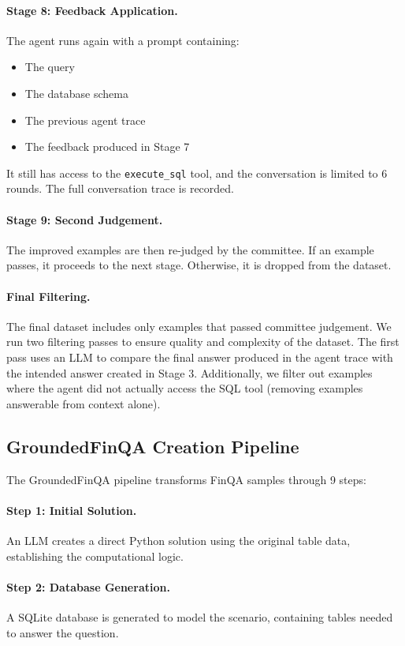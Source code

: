 \documentclass[11pt]{article}
\newcommand{\groundedfinqa}{GroundedFinQA\xspace}
\begin{document}
\paragraph{Stage 8: Feedback Application.}
The agent runs again with a prompt containing:
\begin{itemize}
    \item The query
    \item The database schema
    \item The previous agent trace
    \item The feedback produced in Stage 7
\end{itemize}
It still has access to the \texttt{execute\_sql} tool, and the conversation is limited to 6 rounds. The full conversation trace is recorded.

\paragraph{Stage 9: Second Judgement.}
The improved examples are then re-judged by the committee. If an example passes, it proceeds to the next stage. Otherwise, it is dropped from the dataset.

\paragraph{Final Filtering.}
The final dataset includes only examples that passed committee judgement. We run two filtering passes to ensure quality and complexity of the dataset. The first pass uses an LLM to compare the final answer produced in the agent trace with the intended answer created in Stage 3. Additionally, we filter out examples where the agent did not actually access the SQL tool (removing examples answerable from context alone).

\subsection{\groundedfinqa Creation Pipeline}

The \groundedfinqa pipeline transforms FinQA samples through 9 steps:

\paragraph{Step 1: Initial Solution.}
An LLM creates a direct Python solution using the original table data, establishing the computational logic.

\paragraph{Step 2: Database Generation.}
A SQLite database is generated to model the scenario, containing tables needed to answer the question.
\end{document}
